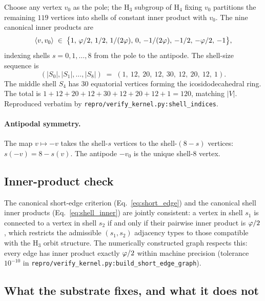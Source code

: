 Choose any vertex $v_{0}$ as the pole; the H$_3$ subgroup of H$_4$
fixing $v_{0}$ partitions the remaining $119$ vertices into shells
of constant inner product with $v_{0}$. The nine canonical inner
products are
\begin{equation}\label{eq:shell_inner}
\langle v, v_{0}\rangle
\;\in\;
\bigl\{1,\, \varphi/2,\, 1/2,\, 1/(2\varphi),\, 0,\,
       -1/(2\varphi),\, -1/2,\, -\varphi/2,\, -1\bigr\},
\end{equation}
indexing shells $s = 0, 1, \ldots, 8$ from the pole to the
antipode. The shell-size sequence is
\begin{equation}\label{eq:shell_sizes}
(|S_{0}|, |S_{1}|, \ldots, |S_{8}|)
\;=\;
(1,\ 12,\ 20,\ 12,\ 30,\ 12,\ 20,\ 12,\ 1).
\end{equation}
The middle shell $S_{4}$ has $30$ equatorial vertices forming the
icosidodecahedral ring. The total is
$1+12+20+12+30+12+20+12+1 = 120$, matching $|V|$. Reproduced
verbatim by \texttt{repro/verify\_kernel.py:shell\_indices}.

\paragraph{Antipodal symmetry.} The map $v \mapsto -v$ takes the
shell-$s$ vertices to the shell-$(8-s)$ vertices: $s(-v) = 8 - s(v)$.
The antipode $-v_{0}$ is the unique shell-$8$ vertex.

\subsection{Inner-product check}\label{ssec:inner_product_check}

The canonical short-edge criterion (Eq.~\eqref{eq:short_edge}) and
the canonical shell inner products (Eq.~\eqref{eq:shell_inner})
are jointly consistent: a vertex in shell $s_{1}$ is connected to a
vertex in shell $s_{2}$ if and only if their pairwise inner product
is $\varphi/2$, which restricts the admissible $(s_{1}, s_{2})$
adjacency types to those compatible with the H$_3$ orbit structure.
The numerically constructed graph respects this: every edge has
inner product exactly $\varphi/2$ within machine precision (tolerance
$10^{-10}$ in \texttt{repro/verify\_kernel.py:build\_short\_edge\_graph}).

\subsection{What the substrate fixes, and what it does not}

